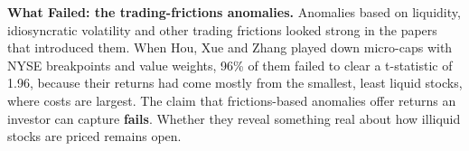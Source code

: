 \begin{callout}
\textbf{What Failed: the trading-frictions anomalies.} Anomalies based on liquidity, idiosyncratic volatility and other trading frictions looked strong in the papers that introduced them. When Hou, Xue and Zhang played down micro-caps with NYSE breakpoints and value weights, 96\% of them failed to clear a t-statistic of 1.96, because their returns had come mostly from the smallest, least liquid stocks, where costs are largest. The claim that frictions-based anomalies offer returns an investor can capture \textbf{fails}. Whether they reveal something real about how illiquid stocks are priced remains open.
\end{callout}
